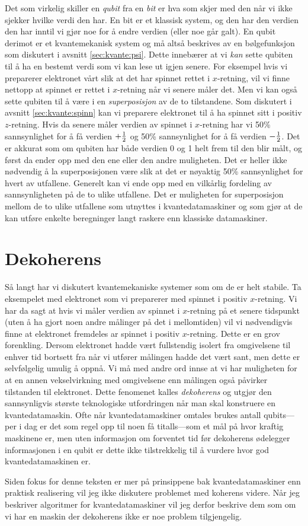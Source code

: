 Det som virkelig skiller en \emph{qubit} fra en \emph{bit} er hva som skjer med den når vi ikke sjekker hvilke verdi den har. En bit er et klassisk system, og den har den verdien den har inntil vi gjør noe for å endre verdien (eller noe går galt). En qubit derimot er et kvantemekanisk system og må altså beskrives av en bølgefunksjon som diskutert i avsnitt \ref{sec:kvante:psi}. Dette innebærer at vi \emph{kan} sette qubiten til å ha en bestemt verdi som vi kan lese ut igjen senere. For eksempel hvis vi preparerer elektronet vårt slik at det har spinnet rettet i $x$-retning, vil vi finne nettopp at spinnet er rettet i $x$-retning når vi senere måler det. Men vi kan også sette qubiten til å være i en \emph{superposisjon} av de to tilstandene. Som diskutert i avsnitt \ref{sec:kvante:spinn} kan vi preparere elektronet til å ha spinnet sitt i positiv $z$-retning. Hvis da senere måler verdien av spinnet i $x$-retning har vi 50\% sannsynlighet for å få verdien $+\frac{1}{2}$ og 50\% sannsynlighet for å få verdien $-\frac{1}{2}$. Det er akkurat som om qubiten har både verdien 0 og 1 helt frem til den blir målt, og først da ender opp med den ene eller den andre muligheten. Det er heller ikke nødvendig å la superposisjonen være slik at det er nøyaktig 50\% sannsynlighet for hvert av utfallene. Generelt kan vi ende opp med en vilkårlig fordeling av sannsynligheten på de to ulike utfallene. Det er muligheten for superposisjon mellom de to ulike utfallene som utnyttes i kvantedatamaskiner og som gjør at de kan utføre enkelte beregninger langt raskere enn klassiske datamaskiner. 

\section{Dekoherens}
Så langt har vi diskutert kvantemekaniske systemer som om de er helt stabile. Ta eksempelet med elektronet som vi preparerer med spinnet i positiv $x$-retning. Vi har da sagt at hvis vi måler verdien av spinnet i $x$-retning på et senere tidspunkt (uten å ha gjort noen andre målinger på det i mellomtiden) vil vi nødvendigvis finne at elektronet fremdeles ar spinnet i positiv $x$-retning. Dette er en grov forenkling. Dersom elektronet hadde vært fullstendig isolert fra omgivelsene til enhver tid bortsett fra når vi utfører målingen hadde det vært sant, men dette er selvfølgelig umulig å oppnå. Vi må med andre ord innse at vi har muligheten for at en annen vekselvirkning med omgivelsene enn målingen også påvirker tilstanden til elektronet. Dette fenomenet kalles \emph{dekoherens} og utgjør den sannsynligvis største teknologiske utfordringen når man skal konstruere en kvantedatamaskin. Ofte når kvantedatamaskiner omtales brukes antall qubits---per i dag er det som regel opp til noen få titalls---som et mål på hvor kraftig maskinene er, men uten informasjon om forventet tid før dekoherens ødelegger informasjonen i en qubit er dette ikke tilstrekkelig til å vurdere hvor god kvantedatamaskinen er. 

Siden fokus for denne teksten er mer på prinsippene bak kvantedatamaskiner enn praktisk realisering vil jeg ikke diskutere problemet med koherens videre. Når jeg beskriver algoritmer for kvantedatamaskiner vil jeg derfor beskrive dem som om vi har en maskin der dekoherens ikke er noe problem tilgjengelig. 